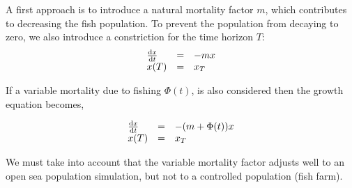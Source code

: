 
A first approach is to introduce a natural mortality factor $m$, which contributes to decreasing the fish population. To prevent the population from decaying to zero, we also introduce a constriction for the time horizon $T$: 
\begin{equation}
\begin{array}{lll}
\frac{\mathrm{d} x}{{\mathrm{d} t}}&=&-mx\\
x(T)&=&x_T
\end{array}
\end{equation}

If a variable mortality due to fishing $\Phi(t)$, is also considered then the growth equation becomes,


\begin{equation}
\begin{array}{lll}
\frac{\mathrm{d} x}{{\mathrm{d} t}}&=&-(m+\Phi(t))x\\
x(T)&=&x_T\\
\end{array}
\end{equation}


We must take into account that the variable mortality factor adjusts well to an open sea population simulation, but not to a controlled population (fish farm).


